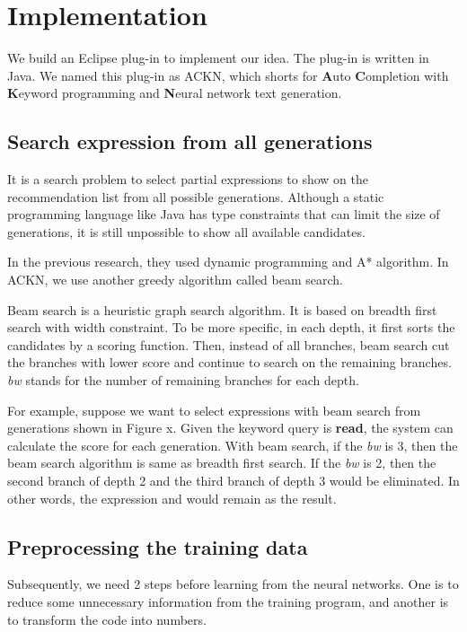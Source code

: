 \documentclass[PRO,english]{ipsj}
\begin{document}
\section{Implementation}\label{sec:implementation}

We build an Eclipse plug-in to implement our idea. The plug-in is written in Java. We named this plug-in as ACKN, which shorts for \textbf{A}uto \textbf{C}ompletion with \textbf{K}eyword programming and \textbf{N}eural network text generation.

\subsection{Search expression from all generations}
It is a search problem to select partial expressions to show on the recommendation list from all possible generations. Although a static programming language like Java has type constraints that can limit the size of generations, it is still unpossible to show all available candidates.

In the previous research, they used dynamic programming and A* algorithm. In ACKN, we use another greedy algorithm called beam search.

Beam search is a heuristic graph search algorithm. It is based on breadth first search with width constraint. To be more specific, in each depth, it first sorts the candidates by a scoring function. Then, instead of all branches, beam search cut the branches with lower score and continue to search on the remaining branches. \textit{bw} stands for the number of remaining branches for each depth.

For example, suppose we want to select expressions with beam search from generations shown in Figure x. Given the keyword query is \textbf{read}, the system can calculate the score for each generation. With beam search, if the \textit{bw} is 3, then the beam search algorithm is same as breadth first search. If the \textit{bw} is 2, then the second branch of depth 2 and the third branch of depth 3 would be eliminated. In other words, the expression \texttt{} and \texttt{} would remain as the result.

\subsection{Preprocessing the training data}
\label{subsection:Preprocessing}
Subsequently, we need 2 steps before learning from the neural networks. One is to reduce some unnecessary information from the training program, and another is to transform the code into numbers.
\end{document}

